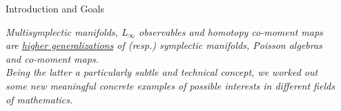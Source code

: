 \documentclass[final,a0paper,20pt,
						pdftex,
            pdfauthor={Antonio Michele Miti},
            pdftitle={Homotopy title},
            pdfsubject={Poster for the conference Super19 in Luxembourg},
            pdfkeywords={Some Keywords},
            pdfproducer={Latex with hyperref, or other system},
            pdfcreator={pdflatex, or other tool}
            ]{beamer}
\newcommand{\pinned}[1]{
    \faThumbTack 
    \hfill
    #1
    \hfill \faThumbTack
    \\
    }
\begin{document}
\begin{frame}[t]
\begin{columns}[t]
\begin{column}{\sepwidexternal}\end{column} %
\begin{column}{\onecolwid} %
		\begin{block}{\pinned{Introduction and Goals}}
			\vspace{-.5em}
			\centering
			\parbox{0.98\linewidth}{%
			\emph{
				{\color{lincolngreen!80!black} Multisymplectic manifolds}, 	
				{\color{norange!80!black}$L_\infty$ observables} and 
				{\color{nred!80!black}homotopy co-moment maps} are 
				\underline{higher generalizations} of (resp.)
				{\color{lincolngreen!80!black} symplectic manifolds}, 
				{\color{norange!80!black} Poisson algebras} and 
				{\color{nred!80!black}co-moment maps}. %
				\\
				Being the latter a particularly subtle and technical concept, 
				we worked out some new meaningful concrete examples of possible interests in different fields of mathematics.
			}
			}
			\vspace{.5em}
		\end{block}

	
	

\end{column}
\end{columns}
\end{frame}
\end{document}
